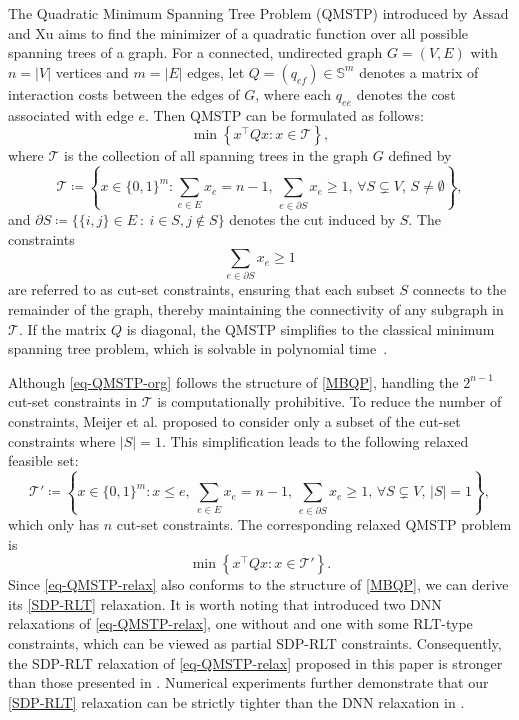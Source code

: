 \documentclass[11pt]{article}
\theoremstyle{plain}
\def\S{\mathbb{S}}
\begin{document}
The Quadratic Minimum Spanning Tree Problem (QMSTP) introduced by Assad and Xu \cite{assad1992quadratic} aims to find the minimizer of a quadratic function over all possible spanning trees of a graph. For a connected, undirected graph $G=(V,E)$ with $n=|V|$ vertices and $m=|E|$ edges, let $Q = (q_{ef}) \in \S^{m}$ denotes a matrix of interaction costs between the edges of $G$, where each $q_{ee}$ denotes the cost associated with edge $e$. Then QMSTP can be formulated as follows:
\begin{equation}\label{eq-QMSTP-org}
    \min\left\{ x^\top Qx:  x \in \mathcal{T}\right\},
\end{equation}
where $\mathcal{T}$ is the collection of all spanning trees in the graph $G$ defined by
\[
\mathcal{T} \coloneqq \left\{ x \in \{0,1\}^{m} : \sum_{e\in E} x_e = n-1, \, \sum_{e \in \partial S} x_e \geq 1, \, \forall S \subsetneq V, \, S \neq \emptyset \right\},
\]
and  $\partial S \coloneqq \big\{ \{i,j\} \in E ~ : ~ i \in S, j\notin S \big\}$ denotes the cut induced by $S$. 
The constraints
\[
\sum_{e \in \partial S} x_e \geq 1
\]
are referred to as cut-set constraints, ensuring that each subset $S$ connects to the remainder of the graph, thereby maintaining the connectivity of any subgraph in $\mathcal{T}$. If the matrix $Q$ is diagonal, the QMSTP simplifies to the classical minimum spanning tree problem, which is solvable in polynomial time~\cite{kruskal1956shortest,prim1957shortest}. 

Although \eqref{eq-QMSTP-org} follows the structure of \eqref{MBQP}, handling the $2^{n-1}$ cut-set constraints in $\mathcal{T}$ is computationally prohibitive. To reduce the number of constraints, Meijer et al. \cite{de2024spanning} proposed to consider only a subset of the cut-set constraints where $|S|=1$. This simplification leads to the following relaxed feasible set:
\[
\mathcal{T}' \coloneqq \left\{ x \in \{0,1\}^{m} : x\leq e,\ \sum_{e\in E} x_e = n-1, \, \sum_{e \in \partial S} x_e \geq 1, \, \forall S \subsetneq V, \,  |S|=1 \right\},
\]
which only has $n$ cut-set constraints. The corresponding relaxed QMSTP problem is
\begin{equation}\label{eq-QMSTP-relax}
    \min\left\{ x^\top Qx:  x \in \mathcal{T}'\right\}.
    \tag{QMSTP}
\end{equation}
Since \eqref{eq-QMSTP-relax} also conforms to the structure of \eqref{MBQP}, we can derive its \eqref{SDP-RLT} relaxation. It is worth noting that \cite{de2024spanning} introduced two DNN relaxations of \eqref{eq-QMSTP-relax}, one without and one with some RLT-type constraints, which can be viewed as partial SDP-RLT constraints. Consequently, the SDP-RLT relaxation of \eqref{eq-QMSTP-relax} proposed in this paper is stronger than those presented in \cite{de2024spanning}. Numerical experiments further demonstrate that our \eqref{SDP-RLT} relaxation can be strictly tighter than the DNN relaxation in \cite{de2024spanning}.
\end{document}
